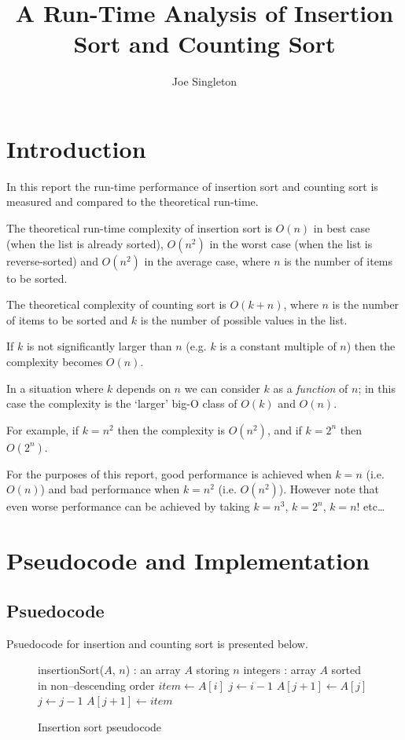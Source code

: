 \documentclass{article}
\title{A Run-Time Analysis of Insertion Sort and Counting Sort}
\author{Joe Singleton}
\date{}
\begin{document}
\maketitle

\tableofcontents

\section{Introduction}

In this report the run-time performance of insertion sort and counting sort is measured and compared to the theoretical run-time.

The theoretical run-time complexity of insertion sort is $O(n)$ in best case (when the list is already sorted), $O(n^2)$ in the worst case (when the list is reverse-sorted) and $O(n^2)$ in the average case, where $n$ is the number of items to be sorted.

The theoretical complexity of counting sort is $O(k+n)$, where $n$ is the number of items to be sorted and $k$ is the number of possible values in the list.

If $k$ is not significantly larger than $n$ (e.g. $k$ is a constant multiple of $n$) then the complexity becomes $O(n)$.

In a situation where $k$ depends on $n$ we can consider $k$ as a \textit{function} of $n$; in this case the complexity is the `larger' big-O class of $O(k)$ and $O(n)$.

For example, if $k=n^2$ then the complexity is $O(n^2)$, and if $k=2^n$ then $O(2^n)$.

For the purposes of this report, good performance is achieved when $k=n$ (i.e. $O(n)$) and bad performance when $k=n^2$ (i.e. $O(n^2)$). However note that even worse performance can be achieved by taking $k=n^3$, $k=2^n$, $k=n!$ etc\ldots

\section{Pseudocode and Implementation}

\subsection{Psuedocode}
Psuedocode for insertion and counting sort is presented below.

\begin{figure}[H]
\begin{algorithmic}
 insertionSort($A$, $n$)
: an array $A$ storing $n$ integers
: array $A$ sorted in non--descending order
  \STATE $item \leftarrow A[i]$
  \STATE $j \leftarrow i-1$
    \STATE $A[j+1] \leftarrow A[j]$
    \STATE $j \leftarrow j-1$
  \ENDWHILE
  \STATE $A[j+1] \leftarrow item$
\ENDFOR
\end{algorithmic}
\caption{Insertion sort pseudocode}
\end{figure}
\end{document}
